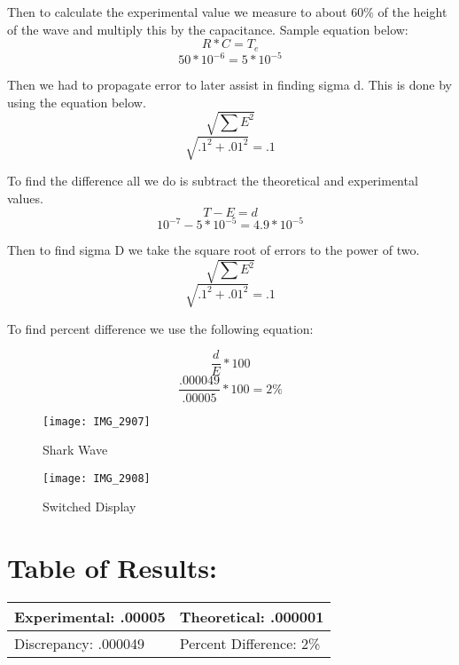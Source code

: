 \documentclass{article}
\begin{document}
Then to calculate the experimental value we measure to about 60\% of the height of the wave and multiply this by the capacitance.  Sample equation below:
\[R*C = T_e\]
\[50 * 10^{-6} = 5*10^{-5}\]

Then we had to propagate error to later assist in finding sigma d.  This is done by using the equation below.
\[\sqrt{\sum E^2}\]
\[\sqrt{.1^2+.01^2} = .1\]

To find the difference all we do is subtract the theoretical and experimental values.
\[T - E = d\]
\[10^{-7} - 5*10^{-5} = 4.9*10^{-5}\]

Then to find sigma D we take the square root of errors to the power of two.
\[\sqrt{\sum E^2}\]
\[\sqrt{.1^2+.01^2} = .1\]

To find percent difference we use the following equation:

\[\frac{d}{E} * 100\]
\[\frac{.000049}{.00005} * 100 = 2\%\]

\newpage

\begin{figure}[h]
\caption{Shark Wave}
\centering
\texttt{[image: IMG\_2907]}
\end{figure}

\begin{figure}[h]
\caption{Switched Display}
\centering
\texttt{[image: IMG\_2908]}
\end{figure}

\newpage

\section*{Table of Results:}
\begin{center}
\begin{tabular}{|l|l|}
\hline
	Experimental: .00005 & Theoretical: .000001  \\ \hline
	Discrepancy: .000049   & Percent Difference: 2\% \\
\hline
\end{tabular}
\end{center}
\end{document}
